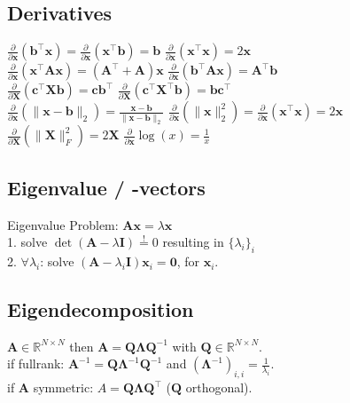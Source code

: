 \subsection*{Derivatives}
$\frac{\partial}{\partial \mathbf{x}}(\mathbf{b}^\top \mathbf{x}) = \frac{\partial}{\partial \mathbf{x}}(\mathbf{x}^\top \mathbf{b}) = \mathbf{b}$ \quad
$\frac{\partial}{\partial \mathbf{x}}(\mathbf{x}^\top \mathbf{x}) = 2\mathbf{x}$\\
$\frac{\partial}{\partial \mathbf{x}}(\mathbf{x}^\top \mathbf{A}\mathbf{x}) = (\mathbf{A}^\top + \mathbf{A})\mathbf{x}$ \quad
$\frac{\partial}{\partial \mathbf{x}}(\mathbf{b}^\top \mathbf{A}\mathbf{x}) = \mathbf{A}^\top \mathbf{b}$\\
$\frac{\partial}{\partial \mathbf{X}}(\mathbf{c}^\top \mathbf{X} \mathbf{b}) = \mathbf{c}\mathbf{b}^\top$ \quad
$\frac{\partial}{\partial \mathbf{X}}(\mathbf{c}^\top \mathbf{X}^\top \mathbf{b}) = \mathbf{b}\mathbf{c}^\top$\\
$\frac{\partial}{\partial \mathbf{x}}(\| \mathbf{x}-\mathbf{b} \|_2) = \frac{\mathbf{x}-\mathbf{b}}{\|\mathbf{x}-\mathbf{b}\|_2}$ \quad
$\frac{\partial}{\partial \mathbf{x}}(\|\mathbf{x}\|^2_2) = \frac{\partial}{\partial \mathbf{x}} (\mathbf{x}^\top \mathbf{x}) = 2\mathbf{x}$\\
$\frac{\partial}{\partial \mathbf{X}}(\|\mathbf{X}\|_F^2) = 2\mathbf{X}$ \quad
$\frac{\partial}{\partial \mathbf{x}}\log(x) = \frac{1}{x}$

\subsection*{Eigenvalue / -vectors}
Eigenvalue Problem: $\mathbf{Ax} = \lambda \mathbf{x}$\\
1. solve $\operatorname{det}(\mathbf{A} - \lambda \mathbf{I}) \overset{!}{=} 0$ resulting in $\{\lambda_i\}_i$\\
2. $\forall \lambda_i$:
solve $(\mathbf{A} - \lambda_i \mathbf{I}) \mathbf{x}_i = \mathbf{0}$, for $\mathbf{x}_i$.

\subsection*{Eigendecomposition}
$\mathbf{A} \in \mathbb{R}^{N \times N}$ then $\mathbf{A} = \mathbf{Q} \boldsymbol{\Lambda} \mathbf{Q}^{-1}$ with $\mathbf{Q} \in \mathbb{R}^{N \times N}$.\\
if fullrank: $\mathbf{A}^{-1} = \mathbf{Q} \boldsymbol{\Lambda}^{-1} \mathbf{Q}^{-1}$ and $(\boldsymbol{\Lambda}^{-1})_{i,i} = \frac{1}{\lambda_i}$.\\
if $\mathbf{A}$ symmetric: $A = \mathbf{Q} \boldsymbol{\Lambda} \mathbf{Q^\top}$ ($\mathbf{Q}$ orthogonal).

